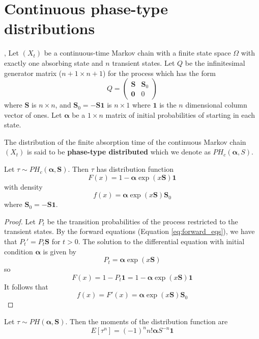 \section{Continuous phase-type distributions}
\begin{defn} %
\cite{neuts1981}, \cite{maier1992}
Let $(X_t)$ be a continuous-time Markov chain with a finite state space $\Omega$ with exactly one absorbing state and $n$ transient states.
Let $Q$ be the infinitesimal generator matrix ($n + 1 \times n + 1$) for the process which has the form
$$
Q = \begin{pmatrix}
\mathbf{S} & \mathbf{S}_0\\
\mathbf{0} & 0
\end{pmatrix}
$$
where $\mathbf{S}$ is $n \times n$, and $\mathbf{S}_0 = - \mathbf{S} \mathbf{1}$ is $n \times 1$ where $\mathbf{1}$ is the $n$ dimensional column vector of ones.
Let $\boldsymbol{\alpha}$ be a $1 \times n$ matrix of initial probabilities of starting in each state.

The distribution of the finite absorption time of the  continuous Markov chain $(X_t)$ is said to be \textbf{phase-type distributed} which we denote as $PH_c(\boldsymbol{\alpha}, S)$.
\end{defn}

\begin{theorem} \label{thm:phase-type-pdf-cdf}
Let $\tau \sim PH_c(\boldsymbol{\alpha}, \mathbf{S})$.
Then $\tau$ has distribution function
$$
F(x) = 1 - \boldsymbol{\alpha} \exp(x \mathbf{S}) \mathbf{1}
$$
with density
$$
f(x) = \boldsymbol{\alpha} \exp(x \mathbf{S}) \mathbf{S}_0
$$
where
$\mathbf{S}_0 = - \mathbf{S 1}$.
\end{theorem}

\begin{proof}
Let $P_t$ be the transition probabilities of the process restricted to the transient states.
By the forward equations (Equation \eqref{eq:forward_eqs}), we have that $P_t' = P_t \mathbf{S}$ for $t > 0$.
The solution to the differential equation with initial condition $\boldsymbol{\alpha}$ is given by
$$
P_t = \boldsymbol{\alpha} \exp(x \mathbf{S})
$$
so
$$
F(x) = 1 - P_t \mathbf{1} = 1 - \boldsymbol{\alpha} \exp(x \mathbf{S}) \mathbf{1}
$$
It follows that
$$
f(x) = F'(x) = \boldsymbol{\alpha} \exp(x \mathbf{S}) \mathbf{S}_0
$$
\end{proof}

\begin{theorem} \label{thm:phase-moments}
Let $\tau \sim PH(\boldsymbol{\alpha}, \mathbf{S})$.
Then the moments of the distribution function are
$$
E[\tau^{{n}}]=(-1)^{{n}}n!{\boldsymbol  {\alpha }}{S}^{{-n}}{\mathbf  {1}}
$$
\end{theorem}

